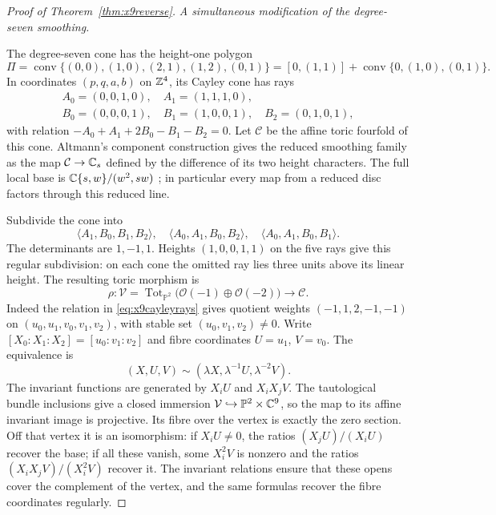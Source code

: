 \begin{proof}[Proof of Theorem~\ref{thm:x9reverse}]
\emph{A simultaneous modification of the degree-seven smoothing.}

The degree-seven cone has the height-one polygon
\[
 \Pi=\operatorname{conv}\{(0,0),(1,0),(2,1),(1,2),(0,1)\}
       =[0,(1,1)]+\operatorname{conv}\{0,(1,0),(0,1)\}.
\]
In coordinates $(p,q,a,b)$ on $\mathbb Z^4$, its Cayley cone has rays
\begin{equation}\label{eq:x9cayleyrays}
\begin{gathered}
 A_0=(0,0,1,0),\quad A_1=(1,1,1,0),\\
 B_0=(0,0,0,1),\quad B_1=(1,0,0,1),\quad B_2=(0,1,0,1),
\end{gathered}
\end{equation}
with relation $-A_0+A_1+2B_0-B_1-B_2=0$. Let $\mathcal C$ be the
affine toric fourfold of this cone. Altmann's component construction
\cite[\S8.1]{Altmann97} gives the reduced smoothing family as the map
$\mathcal C\to\mathbb C_s$ defined by the difference of its two height
characters. The full local base is
$\mathbb C\{s,w\}/(w^2,sw)$ \cite[\S9.1(v)]{Altmann97}; in particular every
map from a reduced disc factors through this reduced line.

Subdivide the cone into
\begin{equation}\label{eq:x9cayleycones}
 \langle A_1,B_0,B_1,B_2\rangle,\quad
 \langle A_0,A_1,B_0,B_2\rangle,\quad
 \langle A_0,A_1,B_0,B_1\rangle.
\end{equation}
The determinants are $1,-1,1$. Heights $(1,0,0,1,1)$ on the five
rays give this regular subdivision: on each cone the omitted ray lies
three units above its linear height. The resulting toric morphism is
\[
 \rho:\mathcal V=\operatorname{Tot}_{\mathbb P^2}
                \bigl(\mathcal O(-1)\oplus\mathcal O(-2)\bigr)
                 \longrightarrow\mathcal C.
\]
Indeed the relation in \eqref{eq:x9cayleyrays} gives quotient weights
$(-1,1,2,-1,-1)$ on $(u_0,u_1,v_0,v_1,v_2)$, with stable set
$(u_0,v_1,v_2)\ne0$. Write $[X_0:X_1:X_2]=[u_0:v_1:v_2]$ and
fibre coordinates $U=u_1$, $V=v_0$. The equivalence is
\[
 (X,U,V)\sim(\lambda X,\lambda^{-1}U,\lambda^{-2}V).
\]
The invariant functions are generated by $X_iU$ and $X_iX_jV$.
The tautological bundle inclusions give a closed immersion
$\mathcal V\hookrightarrow\mathbb P^2\times\mathbb C^9$, so the map
to its affine invariant image is projective. Its fibre over the vertex
is exactly the zero section. Off that vertex it is an isomorphism:
if $X_iU\ne0$, the ratios $(X_jU)/(X_iU)$ recover the base; if all
these vanish, some $X_i^2V$ is nonzero and the ratios
$(X_iX_jV)/(X_i^2V)$ recover it. The invariant relations ensure that
these opens cover the complement of the vertex, and the same formulas
recover the fibre coordinates regularly.


\end{proof}
